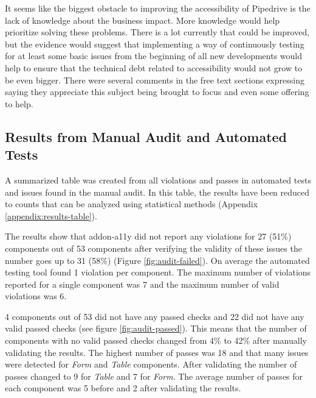 \documentclass{master_thesis}
\begin{document}
It seems like the biggest obstacle to improving the accessibility of Pipedrive is the lack of knowledge about the business impact. More knowledge would help prioritize solving these problems. There is a lot currently that could be improved, but the evidence would suggest that implementing a way of continuously testing for at least some basic issues from the beginning of all new developments would help to ensure that the technical debt related to accessibility would not grow to be even bigger. There were several comments in the free text sections expressing saying they appreciate this subject being brought to focus and even some offering to help.

\subsection{Results from Manual Audit and Automated Tests}


A summarized table was created from all violations and passes in automated tests and issues found in the manual audit. In this table, the results have been reduced to counts that can be analyzed using statistical methods (Appendix \ref{appendix:results-table}).

The results show that addon-a11y did not report any violations for 27 (51\%) components out of 53 components after verifying the validity of these issues the number goes up to 31 (58\%) (Figure \ref{fig:audit-failed}). On average the automated testing tool found 1 violation per component. The maximum number of violations reported for a single component was 7 and the maximum number of valid violations was 6.

4 components out of 53 did not have any passed checks and 22 did not have any valid passed checks (see figure \ref{fig:audit-passed}). This means that the number of components with no valid passed checks changed from 4\%  to 42\% after manually validating the results. The highest number of passes was 18 and that many issues were detected for \textit{Form} and \textit{Table} components. After validating the number of passes changed to 9 for \textit{Table} and 7 for \textit{Form}. The average number of passes for each component was 5 before and 2 after validating the results.
\end{document}

